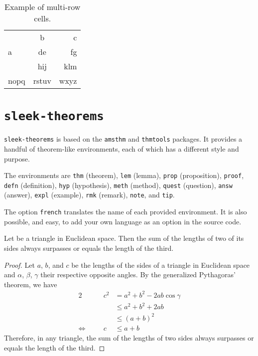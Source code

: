 \documentclass[a4paper, 12pt]{report}
\begin{document}
\begin{table}[H]
	\centering
	\begin{tabular}{|l|c|r|}
		\hline
		\multirow{3}{2cm}{a} &   b   &    c \\ \cline{2-3}
		&  de   &   fg \\ \cline{2-3}
		&  hij  &  klm \\ \hline
		nopq                 & rstuv & wxyz \\ \hline
	\end{tabular}
	\caption{Example of multi-row cells.}
	\label{tab:multirow_example}
\end{table}

\newpage
\section{\texttt{sleek-theorems}}

\texttt{sleek-theorems} is based on the \texttt{amsthm} and \texttt{thmtools} packages. It provides a handful of theorem-like environments, each of which has a different style and purpose.

The environments are \texttt{thm} (theorem), \texttt{lem} (lemma), \texttt{prop} (proposition), \texttt{proof}, \texttt{defn} (definition), \texttt{hyp} (hypothesis), \texttt{meth} (method), \texttt{quest} (question), \texttt{answ} (answer), \texttt{expl} (example), \texttt{rmk} (remark), \texttt{note}, and \texttt{tip}.

\begin{note}
	The option \texttt{french} translates the name of each provided environment. It is also possible, and easy, to add your own language as an option in the source code.
\end{note}

\begin{thm}
	Let be a triangle in Euclidean space. Then the sum of the lengths of two of its sides always surpasses or equals the length of the third.
\end{thm}

\begin{proof}
	Let $a$, $b$, and $c$ be the lengths of the sides of a triangle in Euclidean space and $\alpha$, $\beta$, $\gamma$ their respective opposite angles. By the generalized Pythagoras' theorem, we have
	\begin{alignat*}{2}
		&  & c^2 & = a^2 + b^2 - 2ab \cos\gamma \\
		&  &     & \leq a^2 + b^2 + 2ab         \\
		&  &     & \leq (a + b)^2               \\
		\Leftrightarrow \quad &  & c   & \leq a + b
	\end{alignat*}
	Therefore, in any triangle, the sum of the lengths of two sides always surpasses or equals the length of the third.
\end{proof}
\end{document}
